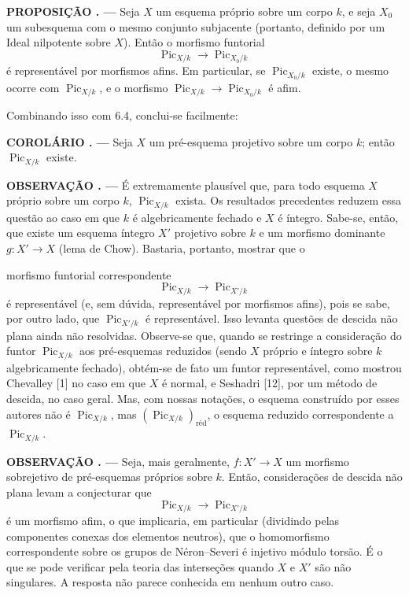 \documentclass[11pt,twoside,openany]{book}
\numberwithin{equation}{section}
\newcommand{\src}[1]{%
  \phantomsection\hypertarget{src:#1}{}%
  \marginpar{\raggedleft\footnotesize\sffamily #1}%
}
\theoremstyle{plain}
\theoremstyle{definition}
\theoremstyle{remark}
\newcommand{\result}[2]{%
  \par\medskip\noindent\textbf{#1%
  \if\relax\detokenize{#2}\relax\else\space#2\fi. ---}\enspace
}
\newcommand{\FgaUnitKey}{frontmatter}
\renewcommand{\src}[1]{%
  \phantomsection\hypertarget{src:\FgaUnitKey:#1}{}%
  \marginpar{\raggedleft\footnotesize\sffamily #1}%
}
\begin{document}
\result{PROPOSIÇÃO}{6.5} Seja $X$ um esquema próprio sobre um corpo $k$, e seja
$X_0$ um subesquema com o mesmo conjunto subjacente (portanto, definido por um
Ideal nilpotente sobre $X$). Então o morfismo funtorial
\[
\operatorname{Pic}_{X/k}\longrightarrow\operatorname{Pic}_{X_0/k}
\]
é representável por morfismos afins. Em particular, se
$\operatorname{Pic}_{X_0/k}$ existe, o mesmo ocorre com
$\operatorname{Pic}_{X/k}$, e o morfismo
$\operatorname{Pic}_{X/k}\longrightarrow\operatorname{Pic}_{X_0/k}$ é afim.

Combinando isso com 6.4, conclui-se facilmente:

\result{COROLÁRIO}{6.6} Seja $X$ um pré-esquema projetivo sobre um corpo $k$;
então $\operatorname{Pic}_{X/k}$ existe.

\result{OBSERVAÇÃO}{6.6} É extremamente plausível que, para todo esquema $X$
próprio sobre um corpo $k$, $\operatorname{Pic}_{X/k}$ exista. Os resultados precedentes reduzem essa questão ao caso em que $k$ é
algebricamente fechado e $X$ é íntegro. Sabe-se, então, que existe um esquema
íntegro $X'$ projetivo sobre $k$ e um morfismo dominante
$g:X'\longrightarrow X$ (lema de Chow). Bastaria, portanto, mostrar que o
\src{160}
morfismo funtorial correspondente
\[
\operatorname{Pic}_{X/k}\longrightarrow\operatorname{Pic}_{X'/k}
\]
é representável (e, sem dúvida, representável por morfismos afins), pois se
sabe, por outro lado, que $\operatorname{Pic}_{X'/k}$ é representável. Isso
levanta questões de descida não plana ainda não resolvidas. Observe-se que,
quando se restringe a consideração do funtor $\operatorname{Pic}_{X/k}$ aos
pré-esquemas reduzidos (sendo $X$ próprio e íntegro sobre $k$ algebricamente
fechado), obtém-se de fato um funtor representável, como mostrou Chevalley [1]
no caso em que $X$ é normal, e Seshadri [12], por um método de descida, no caso
geral. Mas, com nossas notações, o esquema construído por esses autores não é
$\operatorname{Pic}_{X/k}$, mas
$(\operatorname{Pic}_{X/k})_{\mathrm{réd}}$, o esquema reduzido correspondente
a $\operatorname{Pic}_{X/k}$.

\result{OBSERVAÇÃO}{6.7} Seja, mais geralmente, $f:X'\longrightarrow X$ um
morfismo sobrejetivo de pré-esquemas próprios sobre $k$. Então, considerações de
descida não plana levam a conjecturar que
\[
\operatorname{Pic}_{X/k}\longrightarrow\operatorname{Pic}_{X'/k}
\]
é um morfismo afim, o que implicaria, em particular (dividindo pelas
componentes conexas dos elementos neutros), que o homomorfismo correspondente
sobre os grupos de Néron--Severi é injetivo módulo torsão. É o que se pode
verificar pela teoria das interseções quando $X$ e $X'$ são não singulares. A
resposta não parece conhecida em nenhum outro caso.
\end{document}
